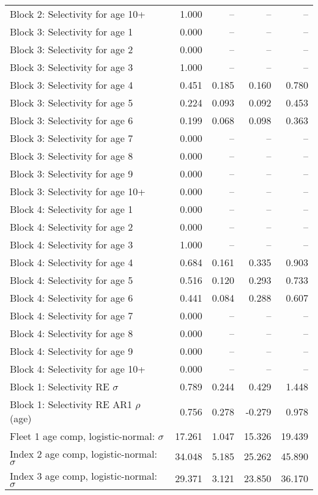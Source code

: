 \documentclass[
]{article}
\begin{document}
\begin{landscape}
\begin{longtable}[t]{lrrrr}
Block 2: Selectivity for age 10+ & 1.000 & -- & -- & --\\
Block 3: Selectivity for age 1 & 0.000 & -- & -- & --\\
Block 3: Selectivity for age 2 & 0.000 & -- & -- & --\\
Block 3: Selectivity for age 3 & 1.000 & -- & -- & --\\
\addlinespace
Block 3: Selectivity for age 4 & 0.451 & 0.185 & 0.160 & 0.780\\
Block 3: Selectivity for age 5 & 0.224 & 0.093 & 0.092 & 0.453\\
Block 3: Selectivity for age 6 & 0.199 & 0.068 & 0.098 & 0.363\\
Block 3: Selectivity for age 7 & 0.000 & -- & -- & --\\
Block 3: Selectivity for age 8 & 0.000 & -- & -- & --\\
\addlinespace
Block 3: Selectivity for age 9 & 0.000 & -- & -- & --\\
Block 3: Selectivity for age 10+ & 0.000 & -- & -- & --\\
Block 4: Selectivity for age 1 & 0.000 & -- & -- & --\\
Block 4: Selectivity for age 2 & 0.000 & -- & -- & --\\
Block 4: Selectivity for age 3 & 1.000 & -- & -- & --\\
\addlinespace
Block 4: Selectivity for age 4 & 0.684 & 0.161 & 0.335 & 0.903\\
Block 4: Selectivity for age 5 & 0.516 & 0.120 & 0.293 & 0.733\\
Block 4: Selectivity for age 6 & 0.441 & 0.084 & 0.288 & 0.607\\
Block 4: Selectivity for age 7 & 0.000 & -- & -- & --\\
Block 4: Selectivity for age 8 & 0.000 & -- & -- & --\\
\addlinespace
Block 4: Selectivity for age 9 & 0.000 & -- & -- & --\\
Block 4: Selectivity for age 10+ & 0.000 & -- & -- & --\\
Block 1: Selectivity RE $\sigma$ & 0.789 & 0.244 & 0.429 & 1.448\\
Block 1: Selectivity RE AR1 $\rho$ (age) & 0.756 & 0.278 & -0.279 & 0.978\\
Fleet 1 age comp, logistic-normal: $\sigma$ & 17.261 & 1.047 & 15.326 & 19.439\\
\addlinespace
Index 2 age comp, logistic-normal: $\sigma$ & 34.048 & 5.185 & 25.262 & 45.890\\
Index 3 age comp, logistic-normal: $\sigma$ & 29.371 & 3.121 & 23.850 & 36.170\\*
\end{longtable}
\end{landscape}
\end{document}
